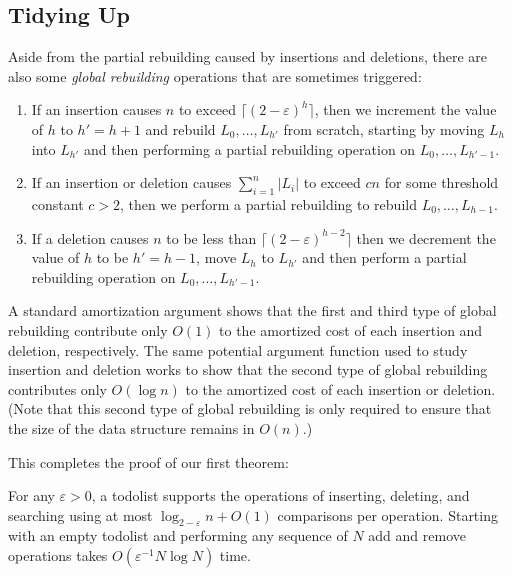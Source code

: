 \documentclass[lotsofwhite]{patmorin}
\newcommand{\eps}{\varepsilon}
\begin{document}
\subsection{Tidying Up}

Aside from the partial rebuilding caused by insertions and deletions,
there are also some \emph{global rebuilding} operations that are sometimes
triggered:
\begin{enumerate}
\item If an insertion causes $n$ to exceed $\lceil(2-\eps)^h\rceil$, then
we increment the value of $h$ to $h'=h+1$ and rebuild $L_0,\ldots,L_{h'}$
from scratch, starting by moving $L_h$ into $L_{h'}$ and then performing
a partial rebuilding operation on $L_{0},\ldots,L_{h'-1}$.
\item If an insertion or deletion causes $\sum_{i=1}^n |L_i|$ to exceed $cn$ for some threshold constant $c>2$, then we perform a partial rebuilding to rebuild $L_{0},\ldots,L_{h-1}$.
\item If a deletion causes $n$ to be less than $\lceil(2-\eps)^{h-2}\rceil$ then we decrement the value of $h$ to be $h'=h-1$, move $L_h$ to $L_{h'}$ and then perform a partial rebuilding operation on $L_{0},\ldots,L_{h'-1}$. 
\end{enumerate}

A standard amortization argument shows that the first and third type
of global rebuilding contribute only $O(1)$ to the amortized cost of
each insertion and deletion, respectively.  The same potential argument
function used to study insertion and deletion works to show that the
second type of global rebuilding contributes only $O(\log n)$ to the
amortized cost of each insertion or deletion.  (Note that this second
type of global rebuilding is only required to ensure that the size of
the data structure remains in $O(n)$.)

This completes the proof of our first theorem:

\begin{thm}
For any $\eps >0$, a todolist supports the operations of inserting,
deleting, and searching using at most $\log_{2-\eps} n + O(1)$ comparisons
per operation.  Starting with an empty todolist and performing any
sequence of $N$ add and remove operations takes $O(\eps^{-1}N\log
N)$ time.
\end{thm}
\end{document}

